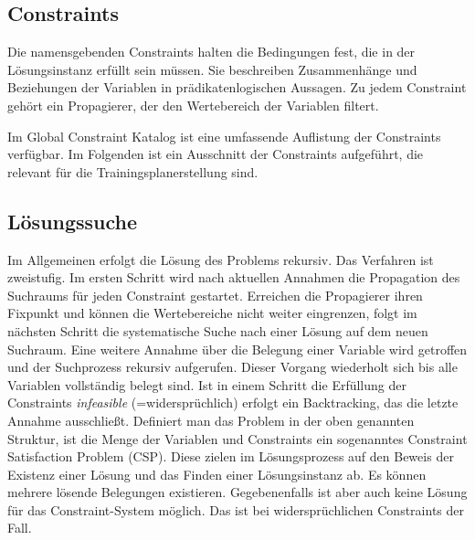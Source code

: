 \subsection{Constraints}
Die namensgebenden Constraints halten die Bedingungen fest, die in der Lösungsinstanz erfüllt sein müssen. Sie beschreiben Zusammenhänge und Beziehungen der Variablen in prädikatenlogischen Aussagen.  Zu jedem Constraint gehört ein Propagierer, der den Wertebereich der Variablen filtert.

Im Global Constraint Katalog \cite{GlobalConstraintWeb}  ist eine umfassende Auflistung der Constraints verfügbar. Im Folgenden ist ein Ausschnitt der Constraints aufgeführt, die relevant für die Trainingsplanerstellung sind.


\subsection{Lösungssuche}
Im Allgemeinen erfolgt die Lösung des Problems rekursiv. Das Verfahren ist zweistufig. Im ersten Schritt wird nach aktuellen Annahmen die Propagation des Suchraums für jeden Constraint gestartet. Erreichen die Propagierer ihren Fixpunkt und können die Wertebereiche nicht weiter eingrenzen, folgt im nächsten Schritt die systematische Suche nach einer Lösung auf dem neuen Suchraum. Eine weitere Annahme über die Belegung einer Variable wird getroffen und der Suchprozess rekursiv aufgerufen. Dieser Vorgang wiederholt sich bis alle Variablen vollständig belegt sind. Ist in einem Schritt die Erfüllung der Constraints \textit{infeasible} (=widersprüchlich) erfolgt ein Backtracking, das die letzte Annahme ausschließt.
Definiert man das Problem in der oben genannten Struktur, ist die Menge der Variablen und Constraints ein sogenanntes Constraint Satisfaction Problem (CSP). Diese zielen im Lösungsprozess auf den Beweis der Existenz einer Lösung und das Finden einer Lösungsinstanz ab. Es können mehrere lösende Belegungen existieren. Gegebenenfalls ist aber auch keine Lösung für das Constraint-System möglich. Das ist bei widersprüchlichen Constraints der Fall. 
